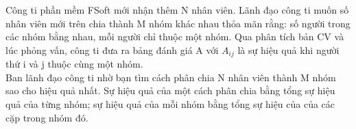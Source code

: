 Công ti phần mềm FSoft mới nhận thêm N nhân viên. Lãnh đạo công ti muốn số nhân viên mới trên chia thành M nhóm khác nhau thỏa mãn rằng: số người trong các nhóm bằng nhau, mỗi người chỉ thuộc một nhóm. Qua phân tích bản CV và lúc phỏng vấn, công ti đưa ra bảng đánh giá A với $A_{ij}$   là sự hiệu quả khi người thứ i và j thuộc cùng một nhóm.   
\\   Ban lãnh đạo công ti nhờ bạn tìm cách phân chia N nhân viên thành M nhóm sao cho hiệu quả nhất. Sự hiệu quả của một cách phân chia bằng tổng sự hiệu quả của từng nhóm; sự hiệu quả của mỗi nhóm bằng tổng sự hiệu của của các cặp trong nhóm đó.